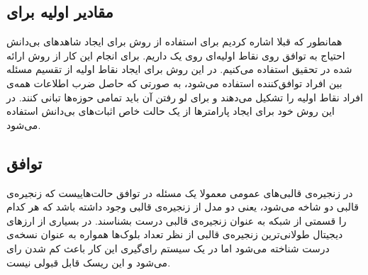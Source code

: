 \subsection{مقادیر اولیه  برای }
همانطور که قبلا اشاره کردیم برای استفاده از روش  برای ایجاد‌ شاهد‌های بی‌دانش احتیاج به توافق روی نقاط اولیه‌ای روی یک  داریم. برای انجام این کار از روش ارائه شده در تحقیق 
\cite{multipartyparams}
استفاده می‌کنیم. در این روش برای ایجاد نقاط اولیه از تقسیم مسئله‌ بین افراد توافق‌کننده استفاده می‌شود، به صورتی که حاصل ضرب اطلاعات همه‌ی افراد نقاط اولیه را تشکیل می‌دهند و برای لو رفتن آن باید تمامی حوزه‌ها تبانی کنند. در این روش خود برای ایجاد پارامترها از یک حالت خاص اثبات‌های بی‌دانش استفاده می‌شود. 
\subsection{توافق}
 در زنجیره‌ی قالبی‌های عمومی معمولا یک مسئله‌ در توافق حالت‌هاییست که زنجیره‌ی قالبی دو شاخه می‌شود، یعنی دو مدل از زنجیره‌ی قالبی وجود داشته باشد که هر کدام را قسمتی از شبکه به عنوان زنجیره‌ی قالبی درست بشناسند. در بسیاری از ارزهای دیجیتال طولانی‌ترین زنجیره‌ی قالبی از نظر تعداد بلوک‌ها همواره به عنوان نسخه‌ی درست شناخته می‌شود اما در یک سیستم رای‌گیری این کار باعث کم شدن رای‌‌ می‌شود و این ریسک قابل قبولی نیست. 
 
